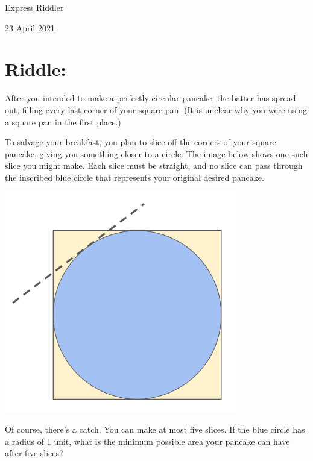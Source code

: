 \documentclass{article}
\begin{document}
\pagestyle{empty} %

\begin{center}
{\LARGE Express Riddler}

\vspace{0.15in}

{\Large 23 April 2021}
\end{center}


\section*{Riddle:}

After you intended to make a perfectly circular pancake, the batter has spread out, filling every last corner of your square pan.
(It is unclear why you were using a square pan in the first place.)

To salvage your breakfast, you plan to slice off the corners of your square pancake, giving you something closer to a circle.
The image below shows one such slice you might make.
Each slice must be straight, and no slice can pass through the inscribed blue circle that represents your original desired pancake.

\vspace{0.1in}
\begin{center}
\includegraphics[width=4in]{circle_cut.png}
\end{center}
\vspace{0.1in}

Of course, there's a catch.
You can make at most five slices.
If the blue circle has a radius of 1 unit, what is the minimum possible area your pancake can have after five slices?
\end{document}
